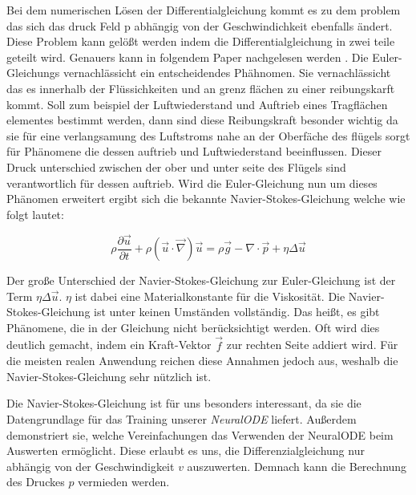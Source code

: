 Bei dem numerischen Lösen der Differentialgleichung kommt es zu dem problem das sich das druck Feld p
abhängig von der Geschwindichkeit ebenfalls ändert.
Diese Problem kann gelößt werden indem die Differentialgleichung in zwei teile geteilt wird.
Genauers kann in folgendem Paper nachgelesen werden \cite{num_navier}.
Die Euler-Gleichungs vernachlässicht ein entscheidendes Phähnomen.
Sie vernachlässicht das es innerhalb der Flüssichkeiten und an grenz flächen zu einer reibungskarft kommt.
Soll zum beispiel der Luftwiederstand und Auftrieb eines Tragflächen elementes bestimmt werden,
dann sind diese Reibungskraft besonder wichtig da sie für eine verlangsamung des Luftstroms nahe an der Oberfäche
des flügels sorgt für Phänomene die dessen auftrieb und Luftwiederstand beeinflussen.
Dieser Druck unterschied zwischen der ober und unter seite des Flügels sind verantwortlich für dessen auftrieb.
Wird die Euler-Gleichung nun um dieses Phänomen erweitert ergibt sich die bekannte Navier-Stokes-Gleichung \cite[Kapitel~1.4]{navier_stokes} 
welche wie folgt lautet:

$$
\rho \frac{\partial \vec{u}}{\partial t} + \rho (\vec{u} \cdot \vec{\nabla} ) \vec{u} = 
\rho \vec{g} - \nabla \cdot \vec{p} + \eta \Delta \vec{u}
$$

Der große Unterschied der Navier-Stokes-Gleichung zur Euler-Gleichung ist der Term $\eta \Delta \vec{u}$.
$\eta$ ist dabei eine Materialkonstante für die Viskosität.
Die Navier-Stokes-Gleichung ist unter keinen Umständen vollständig.
Das heißt, es gibt Phänomene, die in der Gleichung nicht berücksichtigt werden.
Oft wird dies deutlich gemacht, indem ein Kraft-Vektor $\vec{f}$ zur rechten Seite addiert wird.
Für die meisten realen Anwendung reichen diese Annahmen jedoch aus, weshalb die Navier-Stokes-Gleichung sehr nützlich ist.

Die Navier-Stokes-Gleichung ist für uns besonders interessant, da sie die Datengrundlage für das Training unserer \textit{NeuralODE} liefert.
Außerdem demonstriert sie, welche Vereinfachungen das Verwenden der NeuralODE beim Auswerten ermöglicht.
Diese erlaubt es uns, die Differenzialgleichung nur abhängig von der Geschwindigkeit $v$ auszuwerten.
Demnach kann die Berechnung des Druckes $p$ vermieden werden.

